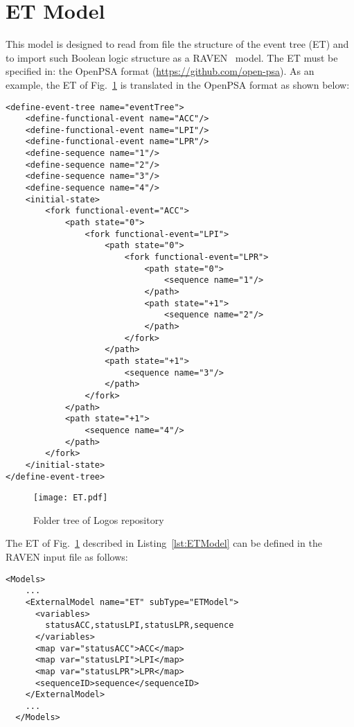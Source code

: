 \section{ET Model}
\label{sec:ETModel}

This model is designed to read from file the structure of the event tree (ET) and to
import such Boolean logic structure as a RAVEN~\cite{RAVEN,RAVENtheoryMan} model.
The ET must be specified in: the OpenPSA format (\href{<url>}{https://github.com/open-psa}).
As an example, the ET of Fig.~\ref{fig:ET} is translated in the OpenPSA format as shown below:

\begin{lstlisting}[style=XML,morekeywords={anAttribute},caption=ET of Fig.~\ref{fig:ET} in OpenPSA format., label=lst:ETModel]
<define-event-tree name="eventTree">
    <define-functional-event name="ACC"/>
    <define-functional-event name="LPI"/>
    <define-functional-event name="LPR"/>
    <define-sequence name="1"/>
    <define-sequence name="2"/>
    <define-sequence name="3"/>
    <define-sequence name="4"/>
    <initial-state>
        <fork functional-event="ACC">
            <path state="0">
                <fork functional-event="LPI">
                    <path state="0">
                        <fork functional-event="LPR">
                            <path state="0">
                                <sequence name="1"/>
                            </path>
                            <path state="+1">
                                <sequence name="2"/>
                            </path>
                        </fork>
                    </path>
                    <path state="+1">
                        <sequence name="3"/>
                    </path>
                </fork>
            </path>
            <path state="+1">
                <sequence name="4"/>
            </path>
        </fork>
    </initial-state>
</define-event-tree>
\end{lstlisting}

\begin{figure}
    \centering
    \centerline{\texttt{[image: ET.pdf]}}
    \caption{Folder tree of Logos repository}
    \label{fig:ET}
\end{figure}

The ET of Fig.~\ref{fig:ET} described in Listing~\ref{lst:ETModel} can be defined in the RAVEN input file as follows:
\begin{lstlisting}[style=XML,morekeywords={anAttribute},caption=ET model input example., label=lst:ET_InputExample]
  <Models>
    ...
    <ExternalModel name="ET" subType="ETModel">
      <variables>
        statusACC,statusLPI,statusLPR,sequence
      </variables>
      <map var="statusACC">ACC</map>
      <map var="statusLPI">LPI</map>
      <map var="statusLPR">LPR</map>
      <sequenceID>sequence</sequenceID>
    </ExternalModel>
    ...
  </Models>
\end{lstlisting}

